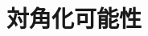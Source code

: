 \documentclass[../../../topic_linear-algebra]{subfiles}
\begin{document}
\sectionline
\section{対角化可能性}
\end{document}
